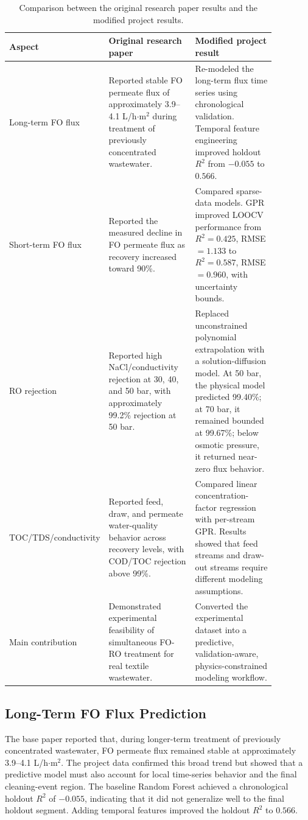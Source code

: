 \documentclass[journal, onecolumn, 12pt]{IEEEtran}
\begin{document}
\begin{table}[H]
\centering
\caption{Comparison between the original research paper results and the modified project results.}
\label{tab:original_modified_overview}
\begin{tabular}{p{0.19\linewidth}p{0.34\linewidth}p{0.34\linewidth}}
\toprule
Aspect & Original research paper & Modified project result \\
\midrule
Long-term FO flux & Reported stable FO permeate flux of approximately 3.9--4.1 L/h$\cdot$m$^2$ during treatment of previously concentrated wastewater. & Re-modeled the long-term flux time series using chronological validation. Temporal feature engineering improved holdout $R^2$ from $-0.055$ to $0.566$. \\
Short-term FO flux & Reported the measured decline in FO permeate flux as recovery increased toward 90\%. & Compared sparse-data models. GPR improved LOOCV performance from $R^2=0.425$, RMSE $=1.133$ to $R^2=0.587$, RMSE $=0.960$, with uncertainty bounds. \\
RO rejection & Reported high NaCl/conductivity rejection at 30, 40, and 50 bar, with approximately 99.2\% rejection at 50 bar. & Replaced unconstrained polynomial extrapolation with a solution-diffusion model. At 50 bar, the physical model predicted 99.40\%; at 70 bar, it remained bounded at 99.67\%; below osmotic pressure, it returned near-zero flux behavior. \\
TOC/TDS/conductivity & Reported feed, draw, and permeate water-quality behavior across recovery levels, with COD/TOC rejection above 99\%. & Compared linear concentration-factor regression with per-stream GPR. Results showed that feed streams and draw-out streams require different modeling assumptions. \\
Main contribution & Demonstrated experimental feasibility of simultaneous FO-RO treatment for real textile wastewater. & Converted the experimental dataset into a predictive, validation-aware, physics-constrained modeling workflow. \\
\bottomrule
\end{tabular}
\end{table}

\subsection{Long-Term FO Flux Prediction}
The base paper reported that, during longer-term treatment of previously concentrated wastewater, FO permeate flux remained stable at approximately 3.9--4.1 L/h$\cdot$m$^2$. The project data confirmed this broad trend but showed that a predictive model must also account for local time-series behavior and the final cleaning-event region. The baseline Random Forest achieved a chronological holdout $R^2$ of $-0.055$, indicating that it did not generalize well to the final holdout segment. Adding temporal features improved the holdout $R^2$ to $0.566$.
\end{document}
